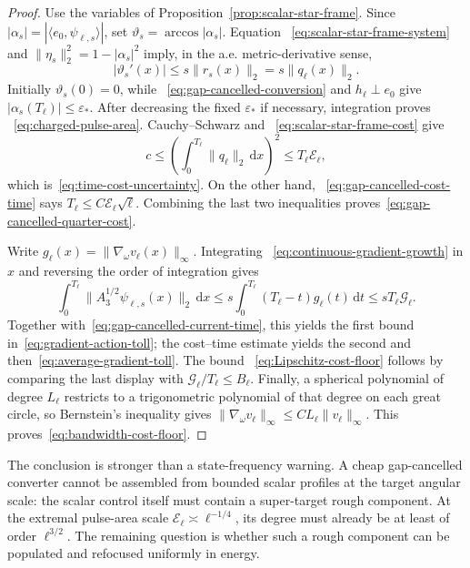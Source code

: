 \documentclass[11pt]{article}
\newcommand{\dd}{\,\mathrm d}
\theoremstyle{definition}
\theoremstyle{remark}
\begin{document}
\begin{proof}
Use the variables of Proposition~\ref{prop:scalar-star-frame}.  Since
$|\alpha_s|=|\langle e_0,\psi_{\ell,s}\rangle|$, set
$\vartheta_s=\arccos|\alpha_s|$.  Equation
~\eqref{eq:scalar-star-frame-system} and
$\|\eta_s\|_2^2=1-|\alpha_s|^2$ imply, in the a.e. metric-derivative sense,
\begin{equation}
 |\vartheta_s'(x)|\leq s\|r_s(x)\|_2
 =s\|q_\ell(x)\|_2.
 \label{eq:star-frame-quantum-speed}
\end{equation}
Initially $\vartheta_s(0)=0$, while
~\eqref{eq:gap-cancelled-conversion} and $h_\ell\perp e_0$ give
$|\alpha_s(T_\ell)|\leq\varepsilon_*$.  After decreasing the fixed
$\varepsilon_*$ if necessary, integration proves
~\eqref{eq:charged-pulse-area}.  Cauchy--Schwarz and
~\eqref{eq:scalar-star-frame-cost} give
\begin{equation}
 c\leq
 \left(\int_0^{T_\ell}\|q_\ell\|_2\dd x\right)^2
 \leq T_\ell\mathcal E_\ell,
\end{equation}
which is~\eqref{eq:time-cost-uncertainty}.  On the other hand,
~\eqref{eq:gap-cancelled-cost-time} says
$T_\ell\leq C\mathcal E_\ell\sqrt\ell$.  Combining the last two inequalities
proves~\eqref{eq:gap-cancelled-quarter-cost}.

Write $g_\ell(x)=\|\nabla_\omega v_\ell(x)\|_\infty$.  Integrating
~\eqref{eq:continuous-gradient-growth} in $x$ and reversing the order of
integration gives
\begin{equation}
 \int_0^{T_\ell}\|A_3^{1/2}\psi_{\ell,s}(x)\|_2\dd x
 \leq s\int_0^{T_\ell}(T_\ell-t)g_\ell(t)\dd t
 \leq sT_\ell\mathcal G_\ell.
\end{equation}
Together with~\eqref{eq:gap-cancelled-current-time}, this yields the first
bound in~\eqref{eq:gradient-action-toll}; the cost--time estimate yields the
second and then~\eqref{eq:average-gradient-toll}.  The bound
~\eqref{eq:Lipschitz-cost-floor} follows by comparing the last display with
$\mathcal G_\ell/T_\ell\leq B_\ell$.  Finally, a spherical polynomial of
degree $L_\ell$ restricts to a trigonometric polynomial of that degree on each
great circle, so Bernstein's inequality gives
$\|\nabla_\omega v_\ell\|_\infty\leq C L_\ell\|v_\ell\|_\infty$.
This proves~\eqref{eq:bandwidth-cost-floor}.
\end{proof}

The conclusion is stronger than a state-frequency warning.  A cheap
gap-cancelled converter cannot be assembled from bounded scalar profiles at
the target angular scale: the scalar control itself must contain a
super-target rough component.  At the extremal pulse-area scale
$\mathcal E_\ell\asymp\ell^{-1/4}$, its degree must already be at least of
order $\ell^{3/2}$.  The remaining question is whether such a rough component
can be populated and refocused uniformly in energy.
\end{document}
